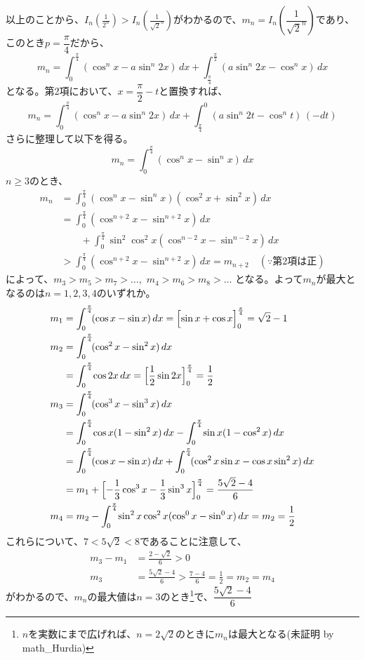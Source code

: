 以上のことから、$I_n\left(\frac{1}{2^n}\right)>I_n\left(\frac{1}{\sqrt{2}^n}\right)$がわかるので、$m_n=I_n\left(\dfrac{1}{\sqrt{2}^n}\right)$であり、このとき$p=\dfrac{\pi}{4}$だから、
\[ m_n=\int_0^{\frac{\pi}{4}}\!(\cos^n x-a\sin^n 2x) \,dx + \int_{\frac{\pi}{4}}^{\frac{\pi}{2}}\!(a\sin^n 2x-\cos^n x) \,dx \]
となる。第2項において、$x=\dfrac{\pi}{2}-t$と置換すれば、
\[ m_n=\int_0^{\frac{\pi}{4}}\!(\cos^n x-a\sin^n 2x) \,dx + \int_{\frac{\pi}{4}}^0\!(a\sin^n 2t-\cos^n t) \,(-dt) \]
さらに整理して以下を得る。
\[ m_n=\int_0^{\frac{\pi}{4}}(\cos^n x-\sin^n x) \,dx \]
$n\ge 3$のとき、
\begin{align*}
 m_n&=\int_0^{\frac{\pi}{4}}\!(\cos^n x-\sin^n x)(\cos^2 x+\sin^2 x)\,dx \\
 &=\int_0^{\frac{\pi}{4}}\! (\cos^{n+2}x -\sin^{n+2}x) \,dx \\
 &\qquad + \int_0^{\frac{\pi}{4}}\!\sin^2\cos^2x(\cos^{n-2}x-\sin^{n-2}x)\,dx \\
 &> \int_0^{\frac{\pi}{4}}\!(\cos^{n+2}x-\sin^{n+2}x) \,dx = m_{n+2} \quad (\because \text{第2項は正})
\end{align*}
によって、$m_3>m_5>m_7>\dots$,~$m_4>m_6>m_8>\dots$ となる。よって$m_n$が最大となるのは$n=1, 2, 3, 4$のいずれか。
\begin{align*}
 m_1&=\int_0^{\frac{\pi}{4}}\!(\cos x-\sin x) \,dx = \Bigl[\sin x+\cos x\Bigr]_0^{\frac{\pi}{4}}=\sqrt{2}-1 \\
 m_2&=\int_0^{\frac{\pi}{4}}\!(\cos^2x-\sin^2x) \,dx \\
 &=\int_0^{\frac{\pi}{4}}\! \cos 2x \,dx=\Bigl[\frac{1}{2}\sin 2x\Bigr]_0^{\frac{\pi}{4}}=\frac{1}{2} \\
 m_3&=\int_0^{\frac{\pi}{4}}\!(\cos^3x-\sin^3x) \,dx \\
 &= \int_0^{\frac{\pi}{4}}\!\cos x(1-\sin^2 x) \,dx-\int_0^{\frac{\pi}{4}}\!\sin x(1-\cos^2 x) \,dx \\
 &=\int_0^{\frac{\pi}{4}}\!(\cos x-\sin x)\,dx+\int_0^{\frac{\pi}{4}}\!(\cos^2 x\sin x-\cos x\sin^2 x) \,dx \\
 &= m_1+\Bigl[-\frac{1}{3}\cos^3 x-\frac{1}{3}\sin^3 x\Bigr]_0^{\frac{\pi}{4}} = \frac{5\sqrt{2}-4}{6} \\
 m_4&=m_2-\int_0^{\frac{\pi}{4}}\!\sin^2 x\cos^2 x(\cos^0 x-\sin^0 x) \,dx = m_2 = \frac{1}{2}
\end{align*}
これらについて、$7<5\sqrt{2}<8$であることに注意して、
\begin{align*}
 m_3-m_1&=\frac{2-\sqrt{2}}{6}>0 \\
 m_3&=\frac{5\sqrt{2}-4}{6}>\frac{7-4}{6}=\frac{1}{2}=m_2=m_4
\end{align*}
がわかるので、$m_n$の最大値は$n=3$のとき\footnote{$n$を実数にまで広げれば、$n=2\sqrt{2}$のときに$m_n$は最大となる(未証明 by math\_Hurdia)}で、$\dfrac{5\sqrt{2}-4}{6}$